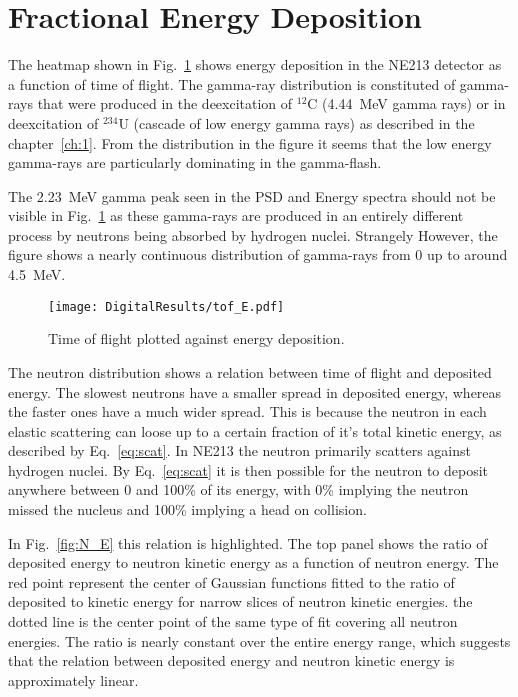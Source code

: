\documentclass[main.tex]{subfiles}
\begin{document}
\section{Fractional Energy Deposition}

The heatmap shown in Fig.~\ref{fig:tof_E_d} shows energy deposition in the NE213 detector as a function of time of flight. The gamma-ray distribution is constituted of gamma-rays that were produced in the deexcitation of $^\mathrm{12}$C (\SI{4.44}{MeV} gamma rays) or in deexcitation of $^\mathrm{234}$U (cascade of low energy gamma rays) as described in the chapter~\ref{ch:1}. From the distribution in the figure it seems that the low energy gamma-rays are particularly dominating in the gamma-flash.

The \SI{2.23}{MeV} gamma peak seen in the PSD and Energy spectra should not be visible in Fig.~\ref{fig:tof_E_d} as these gamma-rays are produced in an entirely different process by neutrons being absorbed by hydrogen nuclei. Strangely However, the figure shows a nearly continuous distribution of gamma-rays from 0 up to around \SI{4.5}{MeV}.

\begin{figure}[ht]
    \centering
        \texttt{[image: DigitalResults/tof\_E.pdf]}
        \caption[Time of flight plotted against energy deposition.]{Time of flight plotted against energy deposition.}
    \label{fig:tof_E_d} 
\end{figure}

The neutron distribution shows a relation between time of flight and deposited energy. The slowest neutrons have a smaller spread in deposited energy, whereas the faster ones have a much wider spread. This is because the neutron in each elastic scattering can loose up to a certain fraction of it's total kinetic energy, as described by Eq.~\ref{eq:scat}. In NE213 the neutron primarily scatters against hydrogen nuclei. By Eq.~\ref{eq:scat} it is then possible for the neutron to deposit anywhere between 0 and 100\% of its energy, with 0\% implying the neutron missed the nucleus and 100\% implying a head on collision.

In Fig.~\ref{fig:N_E} this relation is highlighted. The top panel shows the ratio of deposited energy to neutron kinetic energy as a function of neutron energy. The red point represent the center of Gaussian functions fitted to the ratio of deposited to kinetic energy for narrow slices of neutron kinetic energies. the dotted line is the center point of the same type of fit covering all neutron energies. The ratio is nearly constant over the entire energy range, which suggests that the relation between deposited energy and neutron kinetic energy is approximately linear.
\end{document}
